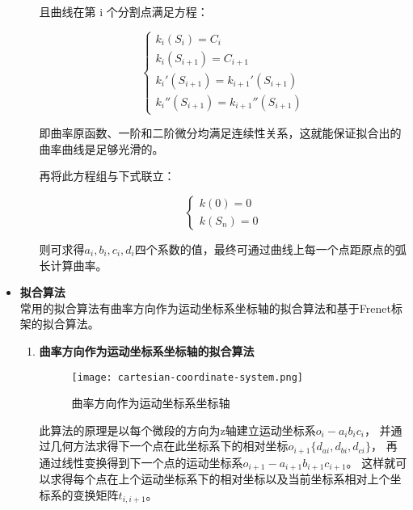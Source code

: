 \begin{itemize}
\begin{enumerate}[label=(\Alph*)]
        且曲线在第 i 个分割点满足方程：

        \begin{equation}
        \left\{
            \begin{array}{lr}
            k_i(S_i) = C_i
        \\
            k_i(S_{i+1}) = C_{i+1}
        \\
            k_i'(S_{i+1}) = k_{i+1}'(S_{i+1})
        \\
            k_i''(S_{i+1}) = k_{i+1}''(S_{i+1})
            \end{array}
        \right.
        \end{equation}

        即曲率原函数、一阶和二阶微分均满足连续性关系，这就能保证拟合出的曲率曲线是足够光滑的。

        再将此方程组与下式联立：

        \begin{equation}
        \left\{
            \begin{array}{lr}
            k(0) = 0
        \\
            k(S_n) = 0
            \end{array}
        \right.
        \end{equation}

        则可求得$a_i, b_i, c_i, d_i$四个系数的值，最终可通过曲线上每一个点距原点的弧长计算曲率。
    \end{enumerate}

    \item \textbf{拟合算法} \\

    常用的拟合算法有曲率方向作为运动坐标系坐标轴的拟合算法和基于Frenet标架的拟合算法。

    \begin{enumerate}[label=(\Alph*)]
        \item \textbf{曲率方向作为运动坐标系坐标轴的拟合算法} \\

        \begin{figure}
        \centering
        \texttt{[image: cartesian-coordinate-system.png]}
        \caption{曲率方向作为运动坐标系坐标轴}
        \end{figure}

        此算法的原理是以每个微段的方向为z轴建立运动坐标系$o_i-a_ib_ic_i$，
        并通过几何方法求得下一个点在此坐标系下的相对坐标\cite{3d-shape-display}$o_{i+1} \{d_{ai}, d_{bi}, d_{ci}\}$，
        再通过线性变换得到下一个点的运动坐标系\cite{three-dimensional-curve}$o_{i+1}-a_{i+1}b_{i+1} c_{i+1}$。
        这样就可以求得每个点在上个运动坐标系下的相对坐标以及当前坐标系相对上个坐标系的变换矩阵$t_{i, i+1}$。


\end{enumerate}
\end{itemize}
